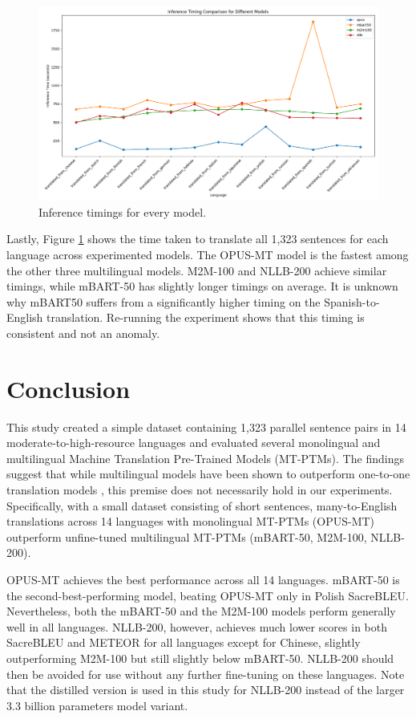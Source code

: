 \documentclass[a4paper, 11pt]{article}
\begin{document}
\begin{figure}[htbp]
    \centering
    \includegraphics[width=1\linewidth]{figures/inference_timings.png}
    \caption{Inference timings for every model.}
    \label{fig:inference_timings}
\end{figure}

Lastly, Figure \ref{fig:inference_timings} shows the time taken to translate all 1,323 sentences for each language across experimented models. The OPUS-MT model is the fastest among the other three multilingual models. M2M-100 and NLLB-200 achieve similar timings, while mBART-50 has slightly longer timings on average. It is unknown why mBART50 suffers from a significantly higher timing on the Spanish-to-English translation. Re-running the experiment shows that this timing is consistent and not an anomaly.


\section{Conclusion}

This study created a simple dataset containing 1,323 parallel sentence pairs in 14 moderate-to-high-resource languages and evaluated several monolingual and multilingual Machine Translation Pre-Trained Models (MT-PTMs). The findings suggest that while multilingual models have been shown to outperform one-to-one translation models \cite{liu-2020-mbart}, this premise does not necessarily hold in our experiments. Specifically, with a small dataset consisting of short sentences, many-to-English translations across 14 languages with monolingual MT-PTMs (OPUS-MT) outperform unfine-tuned multilingual MT-PTMs (mBART-50, M2M-100, NLLB-200).

OPUS-MT achieves the best performance across all 14 languages. mBART-50 is the second-best-performing model, beating OPUS-MT only in Polish SacreBLEU. Nevertheless, both the mBART-50 and the M2M-100 models perform generally well in all languages. NLLB-200, however, achieves much lower scores in both SacreBLEU and METEOR for all languages except for Chinese, slightly outperforming M2M-100 but still slightly below mBART-50. NLLB-200 should then be avoided for use without any further fine-tuning on these languages. Note that the distilled version is used in this study for NLLB-200 instead of the larger 3.3 billion parameters model variant.
\end{document}
